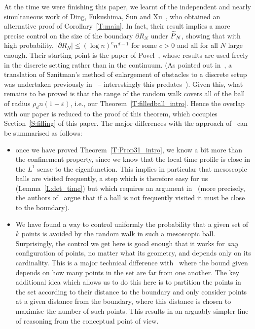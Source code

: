 \documentclass[10pt]{amsart}
\theoremstyle{definition}\newtheorem{defi}[theo]{Definition}\newtheorem{rema}[theo]{Remark}\newtheorem{exam}[theo]{Example}\newtheorem{exem}[theo]{Example}\newtheorem{nota}[theo]{Notation}
\newcommand*\eps{\varepsilon}
\let\oldtilde\tilde
\renewcommand*{\tilde}[1]{\mathchoice{\widetilde{#1}}{\widetilde{#1}}{\oldtilde{#1}}{\oldtilde{#1}}}\let\oldhat\hat
\renewcommand*{\hat}[1]{\mathchoice{\widehat{#1}}{\widehat{#1}}{\oldhat{#1}}{\oldhat{#1}}}\let\oldexists\exists
\renewcommand*{\exists}{\mathrel{\oldexists}}
\begin{document}
At the time we were finishing this paper, we learnt of the independent and nearly simultaneous work of Ding, Fukushima, Sun and Xu~\cite{DFSX}, who obtained an alternative proof of Corollary~\ref{T:main}. In fact, their result implies a more precise control on the size of the boundary $\partial R_N$ under $\tilde P_N$, showing that with high probability, $|\partial R_N| \le (\log n)^c n^{d-1}$ for some $c>0$ and all for all $N$ large enough. Their starting point is the paper of Povel~\cite{Povel}, whose results are used freely in the discrete setting rather than in the continuum. (As pointed out in~\cite{DFSX}, a translation of Sznitman's method of enlargement of obstacles to a discrete setup was undertaken previously in~\cite{Antal} -- interestingly this predates~\cite{Povel}). Given this, what remains to be proved is that the range of the random walk covers all of the ball of radius $\rho_d n (1- \eps)$, i.e., our Theorem~\ref{T:filledball_intro}. Hence the overlap with our paper is reduced to the proof of this theorem, which occupies Section~\ref{S:filling} of this paper. The major differences with the approach of~\cite{DFSX} can be summarised as follows:
\begin{itemize}
\item[--] once we have proved Theorem~\ref{T:Prop31_intro}, we know a bit more than the confinement property, since we know that the local time profile is close in the $L^1$ sense to the eigenfunction. This implies in particular that mesoscopic balls are visited frequently, a step which is therefore easy for us (Lemma~\ref{L:det_time}) but which requires an argument in~\cite{DFSX} (more precisely, the authors of~\cite{DFSX} argue that if a ball is not frequently visited it must be close to the boundary).
\goodbreak


\item[--] We have found a way to control uniformly the probability that a given set of $k$ points is avoided by the random walk in such a mesoscopic ball. Surprisingly, the control we get here is good enough that it works for \emph{any} configuration of points, no matter what its geometry, and depends only on its cardinality. This is a major technical difference with~\cite{DFSX} where the bound given depends on how many points in the set are far from one another. The key additional idea which allows us to do this here is to partition the points in the set according to their distance to the boundary and only consider points at a given distance from the boundary, where this distance is chosen to maximise the number of such points. This results in an arguably simpler line of reasoning from the conceptual point of view.
\end{itemize}
\end{document}
